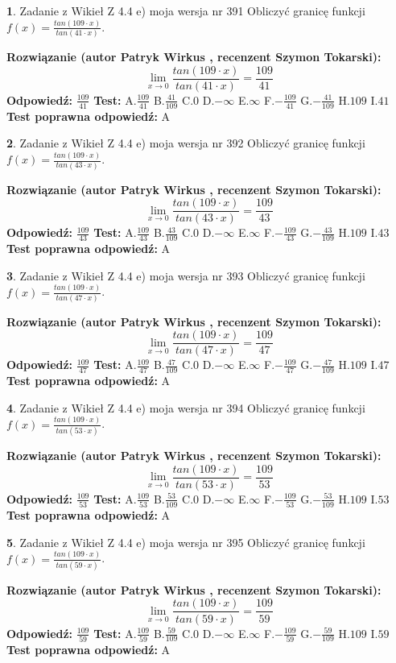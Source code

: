 \documentclass[12pt, a4paper]{article}
\theoremstyle{definition} %
\newtheorem{zad}{}
\newcommand{\zadStart}[1]{\begin{zad}#1\newline}
\newcommand{\zadStop}{\end{zad}}
\newcommand{\rozwStart}[2]{\noindent \textbf{Rozwiązanie (autor #1 , recenzent #2): }\newline}
\newcommand{\rozwStop}{\newline}
\newcommand{\odpStart}{\noindent \textbf{Odpowiedź:}\newline}
\newcommand{\odpStop}{\newline}
\newcommand{\testStart}{\noindent \textbf{Test:}\newline}
\newcommand{\testStop}{\newline}
\newcommand{\kluczStart}{\noindent \textbf{Test poprawna odpowiedź:}\newline}
\newcommand{\kluczStop}{\newline}
\begin{document}
\zadStart{Zadanie z Wikieł Z 4.4 e) moja wersja nr 391}
Obliczyć granicę funkcji $f(x)=\frac{tan(109\cdot x)}{tan(41\cdot x)}$.
\zadStop
\rozwStart{Patryk Wirkus}{Szymon Tokarski}
$$\lim\limits_{x\to 0}\frac{tan(109\cdot x)}{tan(41\cdot x)}=
\frac{109}{41}$$
\rozwStop
\odpStart
$\frac{109}{41}$
\odpStop
\testStart
A.$\frac{109}{41}$
B.$\frac{41}{109}$
C.$0$
D.$-\infty$
E.$\infty$
F.$-\frac{109}{41}$
G.$-\frac{41}{109}$
H.$109$
I.$41$
\testStop
\kluczStart
A
\kluczStop



\zadStart{Zadanie z Wikieł Z 4.4 e) moja wersja nr 392}
Obliczyć granicę funkcji $f(x)=\frac{tan(109\cdot x)}{tan(43\cdot x)}$.
\zadStop
\rozwStart{Patryk Wirkus}{Szymon Tokarski}
$$\lim\limits_{x\to 0}\frac{tan(109\cdot x)}{tan(43\cdot x)}=
\frac{109}{43}$$
\rozwStop
\odpStart
$\frac{109}{43}$
\odpStop
\testStart
A.$\frac{109}{43}$
B.$\frac{43}{109}$
C.$0$
D.$-\infty$
E.$\infty$
F.$-\frac{109}{43}$
G.$-\frac{43}{109}$
H.$109$
I.$43$
\testStop
\kluczStart
A
\kluczStop



\zadStart{Zadanie z Wikieł Z 4.4 e) moja wersja nr 393}
Obliczyć granicę funkcji $f(x)=\frac{tan(109\cdot x)}{tan(47\cdot x)}$.
\zadStop
\rozwStart{Patryk Wirkus}{Szymon Tokarski}
$$\lim\limits_{x\to 0}\frac{tan(109\cdot x)}{tan(47\cdot x)}=
\frac{109}{47}$$
\rozwStop
\odpStart
$\frac{109}{47}$
\odpStop
\testStart
A.$\frac{109}{47}$
B.$\frac{47}{109}$
C.$0$
D.$-\infty$
E.$\infty$
F.$-\frac{109}{47}$
G.$-\frac{47}{109}$
H.$109$
I.$47$
\testStop
\kluczStart
A
\kluczStop



\zadStart{Zadanie z Wikieł Z 4.4 e) moja wersja nr 394}
Obliczyć granicę funkcji $f(x)=\frac{tan(109\cdot x)}{tan(53\cdot x)}$.
\zadStop
\rozwStart{Patryk Wirkus}{Szymon Tokarski}
$$\lim\limits_{x\to 0}\frac{tan(109\cdot x)}{tan(53\cdot x)}=
\frac{109}{53}$$
\rozwStop
\odpStart
$\frac{109}{53}$
\odpStop
\testStart
A.$\frac{109}{53}$
B.$\frac{53}{109}$
C.$0$
D.$-\infty$
E.$\infty$
F.$-\frac{109}{53}$
G.$-\frac{53}{109}$
H.$109$
I.$53$
\testStop
\kluczStart
A
\kluczStop



\zadStart{Zadanie z Wikieł Z 4.4 e) moja wersja nr 395}
Obliczyć granicę funkcji $f(x)=\frac{tan(109\cdot x)}{tan(59\cdot x)}$.
\zadStop
\rozwStart{Patryk Wirkus}{Szymon Tokarski}
$$\lim\limits_{x\to 0}\frac{tan(109\cdot x)}{tan(59\cdot x)}=
\frac{109}{59}$$
\rozwStop
\odpStart
$\frac{109}{59}$
\odpStop
\testStart
A.$\frac{109}{59}$
B.$\frac{59}{109}$
C.$0$
D.$-\infty$
E.$\infty$
F.$-\frac{109}{59}$
G.$-\frac{59}{109}$
H.$109$
I.$59$
\testStop
\kluczStart
A
\kluczStop
\end{document}
